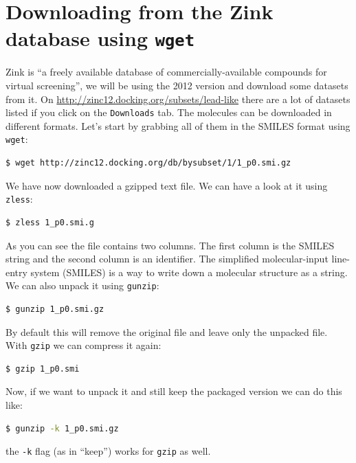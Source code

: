 \documentclass[watermark]{pbpreprint}
\begin{document}
\section{Downloading from the Zink database using \texttt{wget}}
Zink is ``a freely available database of commercially-available compounds for
virtual screening'', we will be using the 2012 version and download some
datasets from it. On \url{http://zinc12.docking.org/subsets/lead-like} there
are a lot of datasets listed if you click on the \texttt{Downloads} tab. The
molecules can be downloaded in different formats. Let's start by grabbing all
of them in the SMILES format using \texttt{wget}:
\begin{lstlisting}[language=bash]
$ wget http://zinc12.docking.org/db/bysubset/1/1_p0.smi.gz
\end{lstlisting}
We have now downloaded a gzipped text file. We can have a look at it using
\texttt{zless}:
%
\begin{lstlisting}[language=bash]
$ zless 1_p0.smi.g
\end{lstlisting}
As you can see the file contains two columns. The first column is the SMILES
string and the second column is an identifier. The simplified molecular-input
line-entry system (SMILES) is a way to write down a molecular structure as a
string. We can also unpack it using \texttt{gunzip}:%
%
\begin{lstlisting}[language=bash]
$ gunzip 1_p0.smi.gz
\end{lstlisting}
By default this will remove the original file and leave only the unpacked
file. With \texttt{gzip} we can compress it again:
%
\begin{lstlisting}[language=bash]
$ gzip 1_p0.smi
\end{lstlisting}
Now, if we want to unpack it and still keep the packaged version we can do this like:
\begin{lstlisting}[language=bash]
$ gunzip -k 1_p0.smi.gz
\end{lstlisting}
the \texttt{-k} flag (as in ``keep'') works for \texttt{gzip} as well. 
\end{document}
